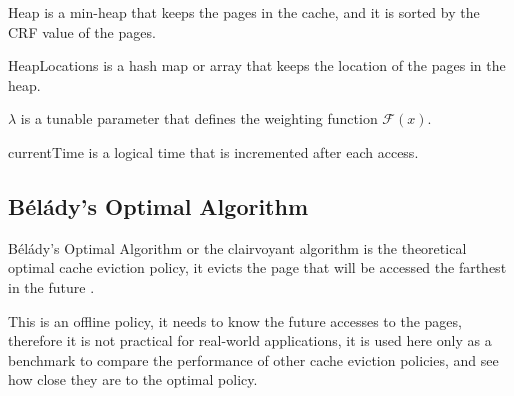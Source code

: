 Heap is a min-heap that keeps the pages in the cache, and it is sorted by the CRF value of the pages.

HeapLocations is a hash map or array that keeps the location of the pages in the heap.

$\lambda$ is a tunable parameter that defines the weighting function $\mathcal{F}(x)$.

currentTime is a logical time that is incremented after each access.

\subsection{Bélády's Optimal Algorithm}

Bélády's Optimal Algorithm or the clairvoyant algorithm is the theoretical optimal cache eviction
policy, it evicts the page that will be accessed the farthest in the future \cite{lecture-notes-1} 
\cite{lecture-notes-2} \cite{article-for-belady-ref-1}.

This is an offline policy, it needs to know the future accesses to the pages, therefore it is not
practical for real-world applications, it is used here only as a benchmark to compare the performance 
of other cache eviction policies, and see how close they are to the optimal policy.


